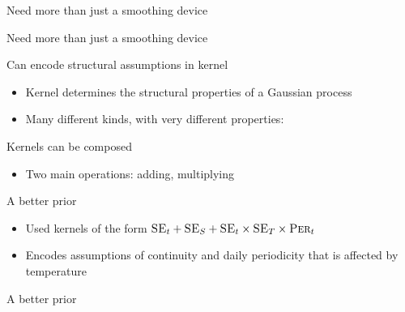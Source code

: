\begin{frame}{Need more than just a smoothing device}
  \begin{center}
    
  \end{center}
\end{frame}

\begin{frame}{Need more than just a smoothing device}
  \begin{center}
    
  \end{center}
\end{frame}

\begin{frame}{Can encode structural assumptions in kernel}
  \begin{itemize} 
	\item Kernel determines the structural properties of a Gaussian process
	\item Many different kinds, with very different properties:
  \end{itemize}
  
\end{frame}


\begin{frame}{Kernels can be composed}
  \begin{itemize} 
	\item Two main operations: adding, multiplying
  \end{itemize}
  
\end{frame}

\begin{frame}{A better prior}
  \begin{itemize}
    \item Used kernels of the form $\textsc{SE}_t + \textsc{SE}_S + \textsc{SE}_t \times \textsc{SE}_T \times \textsc{Per}_t$
    \item Encodes assumptions of continuity and daily periodicity that is affected by temperature
  \end{itemize}
  \begin{centering}
    
  \end{centering}
\end{frame}

\begin{frame}{A better prior}
  \begin{centering}
    
  \end{centering}
\end{frame}

